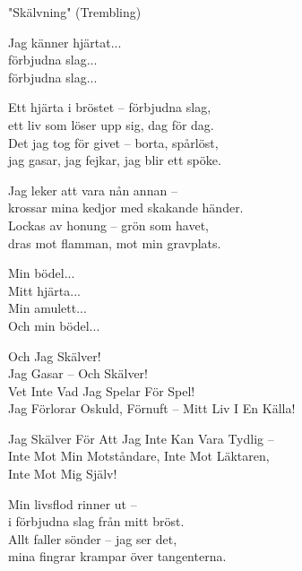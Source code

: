 \begin{lyrics}
"Skälvning" (Trembling)


Jag känner hjärtat...\\
förbjudna slag...\\
förbjudna slag...


Ett hjärta i bröstet – förbjudna slag,\\
ett liv som löser upp sig, dag för dag.\\
Det jag tog för givet – borta, spårlöst,\\
jag gasar, jag fejkar, jag blir ett spöke.

Jag leker att vara nån annan –\\
krossar mina kedjor med skakande händer.\\
Lockas av honung – grön som havet,\\
dras mot flamman, mot min gravplats.


Min bödel...\\
Mitt hjärta...\\
Min amulett...\\
Och min bödel...


Och Jag Skälver!\\
Jag Gasar – Och Skälver!\\
Vet Inte Vad Jag Spelar För Spel!\\
Jag Förlorar Oskuld, Förnuft – Mitt Liv I En Källa!

Jag Skälver För Att Jag Inte Kan Vara Tydlig –\\
Inte Mot Min Motståndare, Inte Mot Läktaren,\\
Inte Mot Mig Själv!


Min livsflod rinner ut –\\
i förbjudna slag från mitt bröst.\\
Allt faller sönder – jag ser det,\\
mina fingrar krampar över tangenterna.


\end{lyrics}
